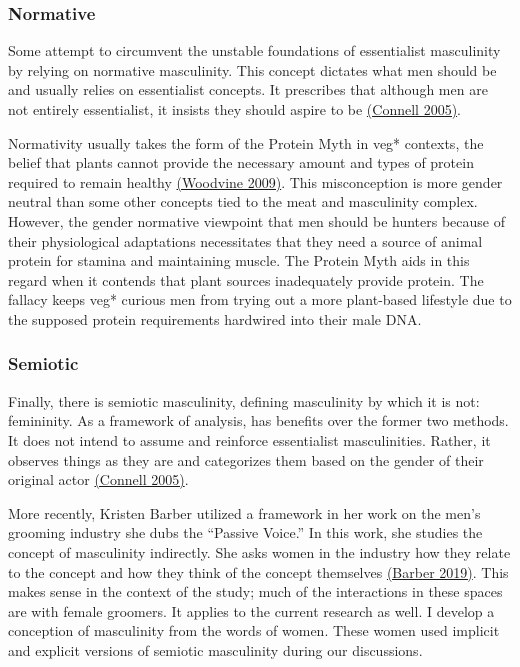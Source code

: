 \documentclass[twoside]{report}
\begin{document}
\begin{multicols}{2}
\subsubsection{Normative}

Some attempt to circumvent the unstable foundations of essentialist
masculinity by relying on normative masculinity. This concept dictates
what men should be and usually relies on essentialist concepts. It
prescribes that although men are not entirely essentialist, it insists
they should aspire to be \hyperlink{connell}{(Connell 2005)}.

Normativity usually takes the form of the Protein Myth in veg* contexts, the belief that plants cannot provide the necessary amount and types of protein required to remain healthy \hyperlink{woodvine}{(Woodvine 2009)}. This misconception is more gender neutral than some other concepts tied to the meat and masculinity complex. However, the gender normative viewpoint that men should be hunters because of their physiological adaptations necessitates that they need a source of animal protein for stamina and maintaining muscle. The Protein Myth aids in this regard when it contends that plant sources inadequately provide protein. The fallacy keeps veg* curious men from trying out a more plant-based lifestyle due to the supposed protein requirements hardwired into their male DNA.

\subsubsection{Semiotic}

Finally, there is semiotic masculinity, defining masculinity by which it
is not: femininity. As a framework of analysis, has benefits over the
former two methods. It does not intend to assume and reinforce
essentialist masculinities. Rather, it observes things as they are and
categorizes them based on the gender of their original actor \hyperlink{connell}{(Connell
2005)}.

More recently, Kristen Barber utilized a framework in her work on the
men's grooming industry she dubs the ``Passive Voice.'' In this work,
she studies the concept of masculinity indirectly. She asks women in the
industry how they relate to the concept and how they
think of the concept themselves \hyperlink{barber2}{(Barber 2019)}. This makes sense in the context of the study; much of the interactions in these spaces are with female groomers. It applies to the current research as well. I develop a conception of masculinity from the words of women. These women used
implicit and explicit versions of semiotic masculinity during our
discussions.


\end{multicols}
\end{document}
